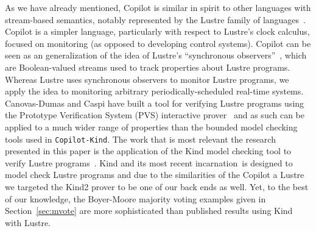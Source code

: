 As we have already mentioned, Copilot is similar in spirit to other
languages with stream-based semantics, notably represented by the
Lustre family of languages~\cite{lustre-intro}.  Copilot is a simpler
language, particularly with respect to Lustre's clock calculus,
focused on monitoring (as opposed to developing control systems).
Copilot can be seen as an generalization of the idea of Lustre's
``synchronous observers''~\cite{Halbwachs93}, which are Boolean-valued
streams used to track properties about Lustre programs.  Whereas
Lustre uses synchronous observers to monitor Lustre programs, we apply
the idea to monitoring arbitrary periodically-scheduled real-time
systems. Canovas-Dumas and Caspi have built a tool for verifying
Lustre programs using the Prototype Verification System (PVS)
interactive prover~\cite{Canovas-Dumas:2000} and as such can be
applied to a much wider range of properties than the bounded model
checking tools used in \texttt{Copilot-Kind}.  The work that is most
relevant the research presented in this paper is the application of
the Kind model checking tool to verify Lustre programs~\cite{Hagen08}.
Kind and its most recent incarnation~\cite{kind}is designed to model
check Lustre programs and due to the similarities of the Copilot a
Lustre we targeted the Kind2 prover to be one of our back ends as
well.  Yet, to the best of our knowledge, the Boyer-Moore majority
voting examples given in Section~\ref{sec:mvote} are more
sophisticated than published results using Kind with Lustre.
  


